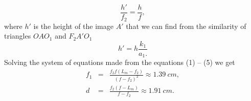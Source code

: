 \documentclass[11pt]{article}
\begin{document}
\begin{equation}
\frac{h'}{f_{2}}=\frac{h}{f},
\end{equation}
where $h'$ is the height of the image $A'$ that we can find from the similarity of triangles $OAO_{1}$ and $F_{2}A'O_{1}$
\begin{equation}
h'=h\frac{k_{1}}{a_{1}.}\label{2017-v3g-08-eq:telelens-eq2}
\end{equation}
Solving the system of equations made from the equations (1) – (5) we get
\begin{eqnarray*}
f_{1} & = & \frac{f_{2}f(L_{m}-f_{2})}{\left(f-f_{2}\right)^{2}}\approx\SI{1.39}{cm},\\
d & = & \frac{f_{2}(f-L_{m})}{f-f_{2}}\approx\SI{1.91}{cm}.
\end{eqnarray*}
\probend
\bigskip

\end{document}
